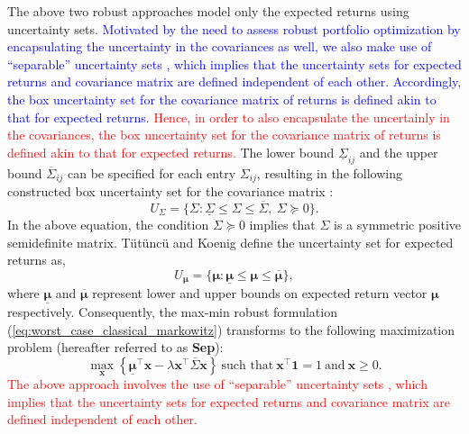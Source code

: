 \documentclass[12pt]{article}
\numberwithin{equation}{section}
\begin{document}
The above two robust approaches model only the expected returns using uncertainty sets. \textcolor{blue}{Motivated by the need to assess robust portfolio optimization by encapsulating the uncertainty in the covariances as well, we also make use of ``separable'' uncertainty sets \cite{Lu06}, which implies that the uncertainty sets for expected returns and covariance matrix are defined independent of each other. Accordingly, the box uncertainty set for the covariance matrix of returns is defined akin to that for expected returns.} \textcolor{red}{Hence, in order to also encapsulate the uncertainly in the covariances, the box uncertainty set for the covariance matrix of returns is defined akin to that for expected returns.} The lower bound $\underline{\Sigma}_{ij}$ and the upper bound $\overline{\Sigma}_{ij}$ can be specified for each entry $\Sigma_{ij}$, resulting in the following constructed box uncertainty set for the covariance matrix \cite{Tutuncu04}:
\begin{equation}
\label{eqn:separable_1}
U_{\Sigma}=\{\Sigma: \underline{\Sigma} \leq \Sigma \leq \overline{\Sigma},~\Sigma \succeq 0\}.
\end{equation}
In the above equation, the condition $\Sigma \succeq 0$ implies that $\Sigma$ is a symmetric positive semidefinite matrix. T{\"u}t{\"u}nc{\"u} and Koenig \cite{Tutuncu04} define the uncertainty set for expected returns as,
\begin{equation}
\label{eqn:separable_2}
U_{\boldsymbol{\mu}}=\{\boldsymbol{\mu}:\underline{\boldsymbol{\mu}}\leq\boldsymbol{\mu}\leq\overline{\boldsymbol{\mu}}\},
\end{equation}
where $\underline{\boldsymbol{\mu}}$ and $\overline{\boldsymbol{\mu}}$ represent lower and upper bounds on expected return vector $\boldsymbol{\mu}$ respectively. Consequently, the max-min robust formulation (\ref{eq:worst_case_classical_markowitz}) transforms to the following maximization problem (hereafter referred to as \textbf{Sep}):
\begin{equation}
\label{eqn:separable_markowitz}
\max_{\mathbf{x}} \left\{\underline{\boldsymbol{\mu}}^{\top}\mathbf{x}-\lambda \mathbf{x^{\top}}\overline{\Sigma}\mathbf{x}\right\}~\text{such that}~ \mathbf{x^{\top}}\mathbf{1}=1~\text{and}~\mathbf{x}\geq 0.
\end{equation}
\textcolor{red}{The above approach involves the use of ``separable'' uncertainty sets \cite{Lu06}, which implies that the uncertainty sets for expected returns and covariance matrix are defined independent of each other.}
\end{document}
